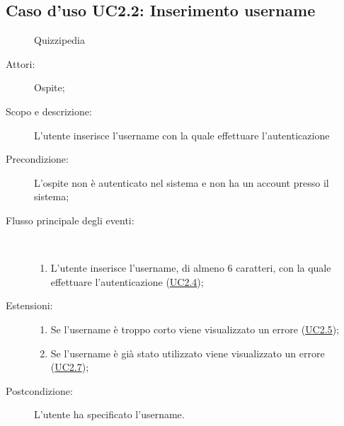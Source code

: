 \subsection{Caso d'uso UC2.2: Inserimento username}
	\begin{figure}[H]
		\centering
		\begin{resizedtikzpicture}{\textwidth}
		\begin{umlsystem}[x=0, fill=lightgray!20]{Quizzipedia}
		\end{umlsystem}
		\end{resizedtikzpicture}
		\caption{}
	\end{figure}
\begin{description}
\item[Attori:] Ospite;
\item[Scopo e descrizione:] L'utente inserisce l'username con la quale effettuare l'autenticazione
      \item[Precondizione:] L'ospite non è autenticato nel sistema e non ha un account presso il sistema;

        \item[Flusso principale degli eventi:] \ 
 \begin{enumerate}
          \item L'utente inserisce l'username, di almeno 6 caratteri, con la quale effettuare l'autenticazione  (\hyperlink{UC2.4}{UC2.4});

      \end{enumerate}
    \item[Estensioni:]
      \begin{enumerate}
          \item Se l'username è troppo corto viene visualizzato un errore (\hyperlink{UC2.5}{UC2.5});
          \item Se l'username è già stato utilizzato viene visualizzato un errore (\hyperlink{UC2.7}{UC2.7});

      \end{enumerate}
    \item[Postcondizione:] L'utente ha specificato l'username.
  \end{description}
\hypertarget{UC2.3}{}
